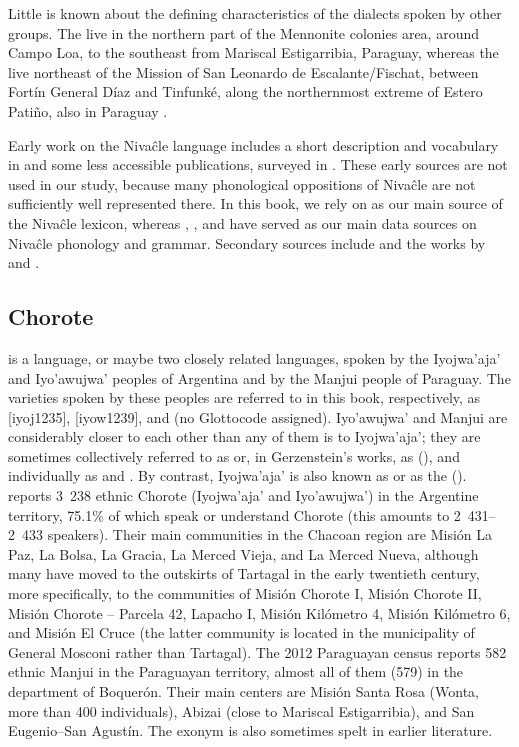 Little is known about the defining characteristics of the dialects spoken by other groups. The  live in the northern part of the Mennonite colonies area, around Campo Loa, to the southeast from Mariscal Estigarribia, Paraguay, whereas the  live northeast of the Mission of San Leonardo de Escalante/Fischat, between Fortín General Díaz and Tinfunké, along the northernmost extreme of Estero Patiño, also in Paraguay \citep[22--23]{NS87}.

Early work on the Nivaĉle language includes a short description and vocabulary in \citet[257--305]{RJH15} and some less accessible publications, surveyed in \citet[15–17]{LC20}. These early sources are not used in our study, because many phonological oppositions of Nivaĉle are not sufficiently well represented there. In this book, we rely on \citet{JS16} as our main source of the Nivaĉle lexicon, whereas \citet{AnG15}, \citet{AF16}, and \citet{LC20} have served as our main data sources on Nivaĉle phonology and grammar. Secondary sources include \citet{NS87} and the works by \citet{AnG15-evid,AnG16,AnG16c,AnG16b,AnG20,AnG21} and \citet{AnG-GE-23}.

\subsection{Chorote} \label{intro-ch}
 is a language, or maybe two closely related languages, spoken by the Iyojwa’aja’ and Iyo’awujwa’ peoples of Argentina and by the Manjui people of Paraguay. The varieties spoken by these peoples are referred to in this book, respectively, as  [iyoj1235],  [iyow1239], and  (no Glottocode assigned). Iyo’awujwa’ and Manjui are considerably closer to each other than any of them is to Iyojwa’aja’; they are sometimes collectively referred to as  or, in Gerzenstein's works, as  (), and individually as  and . By contrast, Iyojwa’aja’ is also known as  or as the  (). \citet{indec2024} reports 3~238 ethnic Chorote (Iyojwa’aja’ and Iyo’awujwa’) in the Argentine territory, 75.1\% of which speak or understand Chorote (this amounts to 2~431–2~433 speakers). Their main communities in the Chacoan region are Misión La Paz, La Bolsa, La Gracia, La Merced Vieja, and La Merced Nueva, although many have moved to the outskirts of Tartagal in the early twentieth century, more specifically, to the communities of Misión Chorote I, Misión Chorote II, Misión Chorote – Parcela 42, Lapacho I, Misión Kilómetro 4, Misión Kilómetro 6, and Misión El Cruce (the latter community is located in the municipality of General Mosconi rather than Tartagal). The 2012 Paraguayan census \citep{ine-py-12} reports 582 ethnic Manjui in the Paraguayan territory, almost all of them (579) in the department of Boquerón. Their main centers are Misión Santa Rosa (Wonta, more than 400 individuals), Abizai (close to Mariscal Estigarribia), and San Eugenio--San Agustín. The exonym  is also sometimes spelt  in earlier literature. 

